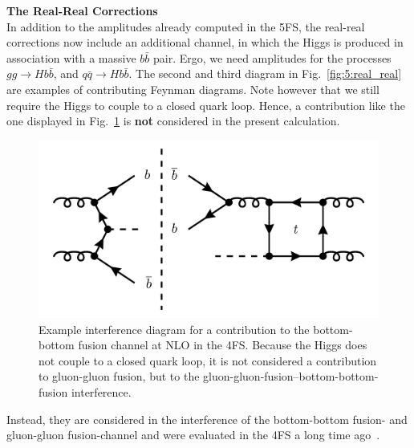 \textbf{The Real-Real Corrections} \\
In addition to the amplitudes already computed in the 5\acs{FS}, the real-real corrections now include an additional channel, in which the Higgs is produced in association with a massive $b \bar{b}$ pair. Ergo, we need amplitudes for the processes $gg \longrightarrow H b \bar{b}$, and $q \bar{q} \longrightarrow H b \bar{b}$. The second and third diagram in Fig.~\ref{fig:5:real_real} are examples of contributing Feynman diagrams. Note however that we still require the Higgs to couple to a closed quark loop. Hence, a contribution like the one displayed in Fig.~\ref{fig:5:ggH_bbH_interference} is \textbf{not} considered in the present calculation.
\begin{figure}[ht]
\centering
\includegraphics[scale=0.3]{Images/NNLO_Feynman_diagrams/interference_with_bbH.pdf}
\caption{Example interference diagram for a contribution to the bottom-bottom fusion channel at \acs{NLO} in the 4\acs{FS}. Because the Higgs does not couple to a closed quark loop, it is not considered a contribution to gluon-gluon fusion, but to the gluon-gluon-fusion--bottom-bottom-fusion interference.}
\label{fig:5:ggH_bbH_interference}
\end{figure}
Instead, they are considered in the interference of the bottom-bottom fusion- and gluon-gluon fusion-channel and were evaluated in the 4\acs{FS} a long time ago~\cite{Dittmaier:2003ej}.

